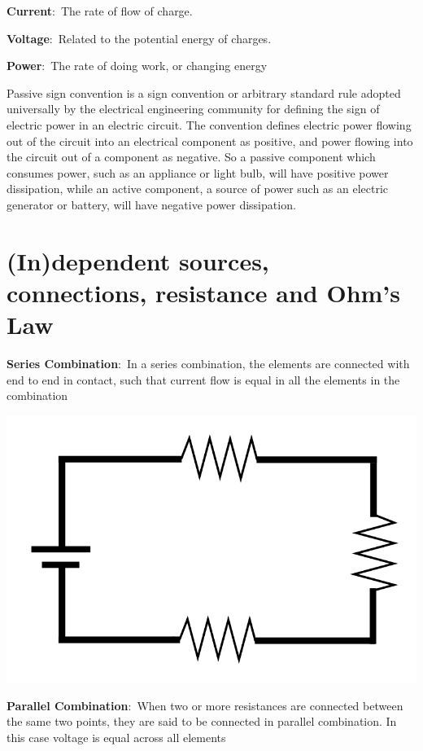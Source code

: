 \documentclass[nobib]{tufte-handout}
\newcommand{\defn}[2]{\noindent\textbf{#1}:\ #2}
\begin{document}
\defn{Current}{The rate of flow of charge.}

\defn{Voltage}{Related to the potential energy of charges.}

\defn{Power}{The rate of doing work, or changing energy}

Passive sign convention is a sign convention or arbitrary 
standard rule adopted universally by the electrical 
engineering community for defining the sign of electric 
power in an electric circuit. The convention defines 
electric power flowing out of the circuit into an electrical 
component as positive, and power flowing into the circuit out 
of a component as negative. So a passive component which 
consumes power, such as an appliance or light bulb, will 
have positive power dissipation, while an active component, 
a source of power such as an electric generator or battery, 
will have negative power dissipation.

\section{(In)dependent sources, connections, resistance and Ohm's Law}

\defn{Series Combination}{In a series combination, the elements 
are connected with end to end in contact, such that 
current flow is equal in all the elements in the 
combination}

\includegraphics[width=\textwidth/2]{images/Series_circuit.svg.png}

\defn{Parallel Combination}{When two or more resistances are 
connected between the same two points, they are said to be 
connected in parallel combination. In this case voltage is equal
across all elements}
\end{document}
